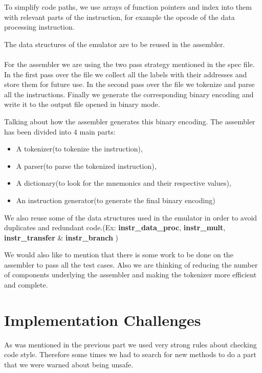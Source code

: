 \documentclass[11pt]{article}
\begin{document}
To simplify code paths, we use arrays of function pointers and index into them
with relevant parts of the instruction, for example the opcode of the data
processing instruction.

The data structures of the emulator are to be reused in the assembler.
\\ \\
For the assembler we are using the two pass strategy mentioned in the spec
file. In the first pass over the file we collect all the labels with their
addresses and store them for future use. In the second pass over the file
we tokenize and parse all the instructions. Finally we generate the
corresponding binary encoding and write it to the output file opened in
binary mode.

Talking about how the assembler generates this binary encoding. The assembler
has been divided into 4 main parts:
\begin{itemize}
\item A tokenizer(to tokenize the instruction),
\item A parser(to parse the tokenized instruction),
\item A dictionary(to look for the mnemonics and their respective values),
\item An instruction generator(to generate the final binary encoding)
\end{itemize}

We also reuse some of the data structures used in the emulator in order to 
avoid duplicates and redundant code.(Ex: 
\textbf{instr\_data\_proc}, \textbf{instr\_mult}, \textbf{instr\_transfer} \& \textbf{instr\_branch}
)

We would also like to mention that there is some work to be done on the
assembler to pass all the test cases. Also we are thinking of reducing the
number of components underlying the assembler and making the tokenizer more
efficient and complete.

\section{Implementation Challenges}

As was mentioned in the previous part we used very strong rules about checking
code style. Therefore some times we had to search for new methods to do a part
that we were warned about being unsafe.
\end{document}
